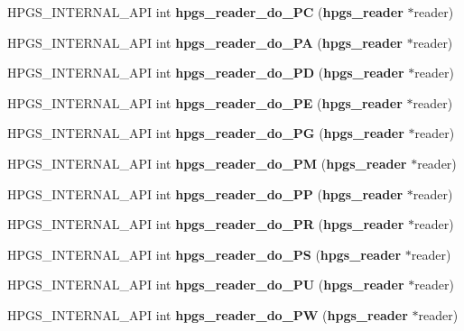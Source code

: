 \begin{CompactItemize}
\item 
HPGS\_\-INTERNAL\_\-API int \textbf{hpgs\_\-reader\_\-do\_\-PC} ({\bf hpgs\_\-reader} $\ast$reader)\label{group__reader_g26e3abc89cd90afe394f3c4a400f9886}

\item 
HPGS\_\-INTERNAL\_\-API int \textbf{hpgs\_\-reader\_\-do\_\-PA} ({\bf hpgs\_\-reader} $\ast$reader)\label{group__reader_gb98375b63e2e33be791f57a3cba84c8c}

\item 
HPGS\_\-INTERNAL\_\-API int \textbf{hpgs\_\-reader\_\-do\_\-PD} ({\bf hpgs\_\-reader} $\ast$reader)\label{group__reader_g5a74597276b52026baea444c783f093f}

\item 
HPGS\_\-INTERNAL\_\-API int \textbf{hpgs\_\-reader\_\-do\_\-PE} ({\bf hpgs\_\-reader} $\ast$reader)\label{group__reader_gb89ccf2e907504a93092c06e6ff48c7f}

\item 
HPGS\_\-INTERNAL\_\-API int \textbf{hpgs\_\-reader\_\-do\_\-PG} ({\bf hpgs\_\-reader} $\ast$reader)\label{group__reader_ga352b34763e04c84c81d154c592c5cd2}

\item 
HPGS\_\-INTERNAL\_\-API int \textbf{hpgs\_\-reader\_\-do\_\-PM} ({\bf hpgs\_\-reader} $\ast$reader)\label{group__reader_g1ccebaf839555816bb65f2f2547da7df}

\item 
HPGS\_\-INTERNAL\_\-API int \textbf{hpgs\_\-reader\_\-do\_\-PP} ({\bf hpgs\_\-reader} $\ast$reader)\label{group__reader_gbd7b5192dd787f46ff9fc8f688e9a4ff}

\item 
HPGS\_\-INTERNAL\_\-API int \textbf{hpgs\_\-reader\_\-do\_\-PR} ({\bf hpgs\_\-reader} $\ast$reader)\label{group__reader_g59dde778a90ffa3910b2f6586e30325d}

\item 
HPGS\_\-INTERNAL\_\-API int \textbf{hpgs\_\-reader\_\-do\_\-PS} ({\bf hpgs\_\-reader} $\ast$reader)\label{group__reader_g75c6bfe334f61695beaa66b3bfede120}

\item 
HPGS\_\-INTERNAL\_\-API int \textbf{hpgs\_\-reader\_\-do\_\-PU} ({\bf hpgs\_\-reader} $\ast$reader)\label{group__reader_gb80900542e36944aa5eb9f4608313968}

\item 
HPGS\_\-INTERNAL\_\-API int \textbf{hpgs\_\-reader\_\-do\_\-PW} ({\bf hpgs\_\-reader} $\ast$reader)\label{group__reader_gbbd62a9fd3ef05c0baaa4a0d87d912b0}


\end{CompactItemize}

